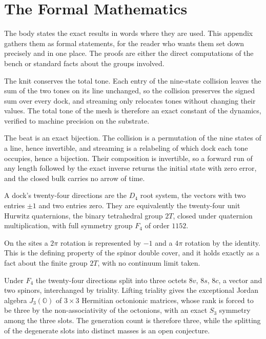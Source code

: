 \section{The Formal Mathematics}
\label{app:math}

The body states the exact results in words where they are used. This appendix gathers them as formal statements, for the reader who wants them set down precisely and in one place. The proofs are either the direct computations of the bench or standard facts about the groups involved.

\begin{proposition}
The knit conserves the total tone. Each entry of the nine-state collision leaves the sum of the two tones on its line unchanged, so the collision preserves the signed sum over every dock, and streaming only relocates tones without changing their values. The total tone of the mesh is therefore an exact constant of the dynamics, verified to machine precision on the substrate.
\end{proposition}

\begin{proposition}
The beat is an exact bijection. The collision is a permutation of the nine states of a line, hence invertible, and streaming is a relabeling of which dock each tone occupies, hence a bijection. Their composition is invertible, so a forward run of any length followed by the exact inverse returns the initial state with zero error, and the closed bulk carries no arrow of time.
\end{proposition}

\begin{definition}
A dock's twenty-four directions are the $D_4$ root system, the vectors with two entries $\pm 1$ and two entries zero. They are equivalently the twenty-four unit Hurwitz quaternions, the binary tetrahedral group $2T$, closed under quaternion multiplication, with full symmetry group $F_4$ of order $1152$.
\end{definition}

\begin{theorem}
On the sites a $2\pi$ rotation is represented by $-1$ and a $4\pi$ rotation by the identity. This is the defining property of the spinor double cover, and it holds exactly as a fact about the finite group $2T$, with no continuum limit taken.
\end{theorem}

\begin{proposition}
Under $F_4$ the twenty-four directions split into three octets $8v$, $8s$, $8c$, a vector and two spinors, interchanged by triality. Lifting triality gives the exceptional Jordan algebra $J_3(\mathbb{O})$ of $3 \times 3$ Hermitian octonionic matrices, whose rank is forced to be three by the non-associativity of the octonions, with an exact $S_3$ symmetry among the three slots. The generation count is therefore three, while the splitting of the degenerate slots into distinct masses is an open conjecture.
\end{proposition}

